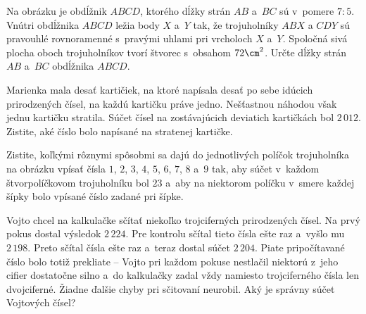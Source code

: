 {%
Na \ifobrazkyvedla{}obrázku\else\obr{}\fi{} je obdĺžnik $ABCD$, ktorého dĺžky strán $AB$ a~$BC$ sú v~pomere $7:5$. Vnútri obdĺžnika $ABCD$ ležia body $X$ a~$Y$ tak, že trojuholníky $ABX$ a $CDY$ sú pravouhlé rovnoramenné s~pravými uhlami pri vrcholoch $X$ a~$Y$. Spoločná sivá plocha oboch trojuholníkov tvorí štvorec s~obsahom $72\cm^2$. Určte dĺžky strán $AB$ a~$BC$ obdĺžnika $ABCD$.
\ifobrazkyvedla~\else{}\fi%
}

{%
Marienka mala desať kartičiek, na ktoré napísala desať po sebe idúcich prirodzených
čísel, na každú kartičku práve jedno. Nešťastnou náhodou však jednu kartičku stratila.
Súčet čísel na zostávajúcich deviatich kartičkách bol $2\,012$. Zistite, aké číslo bolo
napísané na stratenej kartičke.}

{%
Zistite, koľkými rôznymi spôsobmi sa dajú do jednotlivých políčok trojuholníka na \ifobrazkyvedla{}obrázku\else\obr{}\fi{}
vpísať čísla $1$, $2$, $3$, $4$, $5$, $6$, $7$, $8$ a~$9$ tak, aby súčet v~každom štvorpolíčkovom trojuholníku
bol $23$ a~aby na niektorom políčku v~smere každej šípky bolo vpísané číslo zadané pri šípke.
\ifobrazkyvedla~\else{}\fi%
}

{%
Vojto chcel na kalkulačke sčítať niekoľko trojciferných prirodzených čísel. Na prvý pokus
dostal výsledok $2\,224$. Pre kontrolu sčítal tieto čísla ešte raz a~vyšlo mu $2\,198$. Preto sčítal čísla ešte raz a~teraz dostal súčet $2\,204$. Piate pripočítavané číslo bolo totiž prekliate -- Vojto pri každom pokuse nestlačil niektorú z~jeho cifier dostatočne silno a~do kalkulačky zadal
vždy namiesto trojciferného čísla len dvojciferné. Žiadne ďalšie chyby pri sčitovaní neurobil. Aký je správny súčet Vojtových čísel?}

